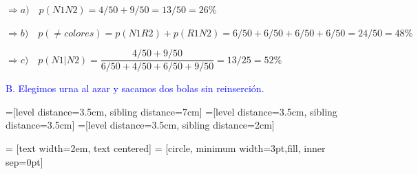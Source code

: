 

\vspace{20mm}%
$\Rightarrow  a)\quad  p(N1N2)=4/50+9/50=13/50=26\%$

\vspace{10mm}%
$\Rightarrow b)\quad p(\neq colores)=p(N1R2)+p(R1N2)=6/50+6/50+6/50+6/50=24/50=48\%$

\vspace{10mm}%
$\Rightarrow c)\quad p(N1|N2)=\dfrac{4/50+9/50}{6/50+4/50+6/50+9/50}=13/25=52\%$










\vspace{40mm} %
\textcolor{blue}{B. Elegimos urna al azar y sacamos dos bolas sin reinserción.}


\vspace{20mm}%


=[level distance=3.5cm, sibling distance=7cm]
=[level distance=3.5cm, sibling distance=3.5cm]
=[level distance=3.5cm, sibling distance=2cm]

 = [text width=2em, text centered]
 = [circle, minimum width=3pt,fill, inner sep=0pt]

